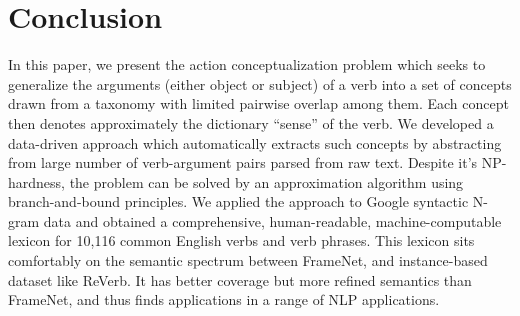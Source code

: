 \section{Conclusion}
\label{sec:conclude}
In this paper, we present the action conceptualization 
problem which seeks to generalize the arguments 
(either object or subject) 
of a verb into a set of concepts drawn from 
a taxonomy with limited pairwise overlap among them. 
Each concept then denotes approximately the dictionary
``sense'' of the verb.
We developed a data-driven approach which automatically
extracts such concepts by abstracting from large 
number of verb-argument pairs parsed from raw text.
Despite it's NP-hardness, the problem can be solved by
an approximation algorithm using branch-and-bound principles.
We applied the approach to Google syntactic N-gram data and
obtained a comprehensive, human-readable, machine-computable 
lexicon for 10,116 common English
verbs and verb phrases. This lexicon sits comfortably on the
semantic spectrum between FrameNet,
and instance-based dataset like ReVerb. It has better
coverage but more refined semantics than FrameNet, and
thus finds applications in a range of NLP applications.

%
